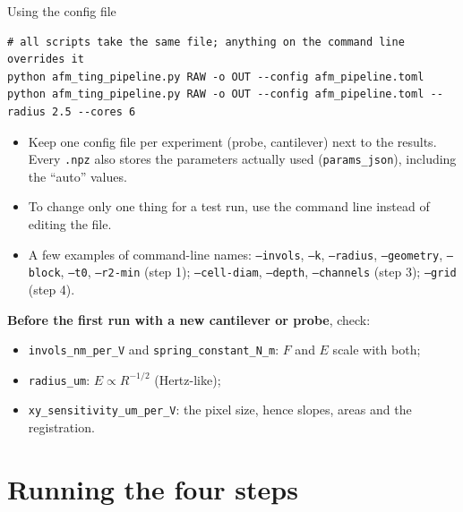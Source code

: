 \documentclass[aspectratio=169,9pt]{beamer}
\begin{document}
\begin{frame}[fragile]{Using the config file}
\small
\begin{lstlisting}
# all scripts take the same file; anything on the command line overrides it
python afm_ting_pipeline.py RAW -o OUT --config afm_pipeline.toml
python afm_ting_pipeline.py RAW -o OUT --config afm_pipeline.toml --radius 2.5 --cores 6
\end{lstlisting}
\begin{itemize}
\item Keep one config file per experiment (probe, cantilever) next to the results. Every \texttt{.npz} also stores the parameters actually used (\texttt{params\_json}), including the ``auto'' values.
\item To change only one thing for a test run, use the command line instead of editing the file.
\item A few examples of command-line names: \texttt{--invols}, \texttt{--k}, \texttt{--radius}, \texttt{--geometry}, \texttt{--block}, \texttt{--t0}, \texttt{--r2-min} (step 1); \texttt{--cell-diam}, \texttt{--depth}, \texttt{--channels} (step 3); \texttt{--grid} (step 4).
\end{itemize}
\textbf{Before the first run with a new cantilever or probe}, check:
\begin{itemize}
\item \texttt{invols\_nm\_per\_V} and \texttt{spring\_constant\_N\_m}: $F$ and $E$ scale with both;
\item \texttt{radius\_um}: $E\propto R^{-1/2}$ (Hertz-like);
\item \texttt{xy\_sensitivity\_um\_per\_V}: the pixel size, hence slopes, areas and the registration.
\end{itemize}
\end{frame}

\section{Running the four steps}
\end{document}
